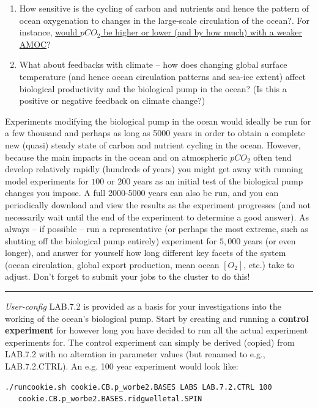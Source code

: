 \begin{enumerate}[noitemsep]
\vspace{1mm}
\item How sensitive is the cycling of carbon and nutrients and hence the pattern of ocean oxygenation to changes in the large-scale circulation of the ocean?. For instance, \uline{would \(pCO_{2}\) be higher or lower (and by how much) with a weaker AMOC}?
\vspace{1mm}
\item What about feedbacks with climate -- how does changing global surface temperature (and hence ocean circulation patterns and sea-ice extent) affect biological productivity and the biological pump in the ocean? (Is this a positive or negative feedback on climate change?)
\end{enumerate}
\vspace{1mm}

\newpage
%
Experiments modifying the biological pump in the ocean would ideally be run for a few thousand and perhaps as long as 5000 years in order to obtain a complete new (quasi) steady state of carbon and nutrient cycling in the ocean. However, because the main impacts in the ocean and on atmospheric \(pCO_{2}\) often tend develop relatively rapidly (hundreds of years) you might get away with running model experiments for $100$ or $200$ years as an initial test of the biological pump changes you impose.  A full 2000-5000 years can also be run, and you can periodically download and view the results as the experiment progresses (and not necessarily wait until the end of the experiment to determine a good answer). As always -- if possible -- run a representative (or perhaps the most extreme, such as shutting off the biological pump entirely) experiment for $5,000$ years (or even longer), and answer for yourself how long different key facets of the system (ocean circulation, global export production, mean ocean \([O_{2}]\), etc.) take to adjust. Don't forget to submit your jobs to the cluster to do this!

\vspace{1mm}\noindent\rule{4cm}{0.5pt}\vspace{2mm}

\noindent \textit{User-config} \textsf{\footnotesize LAB.7.2} is provided as a basis for your investigations into  the working of the ocean's biological pump. Start by creating and running a \textbf{control experiment} for however long you have decided to run all the actual experiment experiments for. The control experiment can simply be derived (copied) from \textsf{\footnotesize LAB.7.2} with no alteration in parameter values (but renamed to e.g., \textsf{\footnotesize LAB.7.2.CTRL}). An e.g. 100 year experiment would look like:
\vspace{-1mm}\small\begin{verbatim}
./runcookie.sh cookie.CB.p_worbe2.BASES LABS LAB.7.2.CTRL 100 
   cookie.CB.p_worbe2.BASES.ridgwelletal.SPIN
\end{verbatim}\normalsize\vspace{-1mm}

